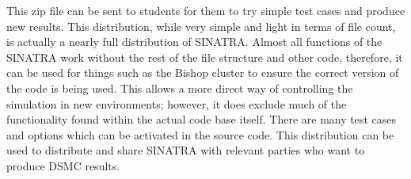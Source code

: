 \indent This zip file can be sent to students for them to try simple test cases and produce new results. This distribution, while very simple and light in terms of file count, is actually a nearly full distribution of SINATRA. Almost all functions of the SINATRA work without the rest of the file structure and other code, therefore, it can be used for things such as the Bishop cluster to ensure the correct version of the code is being used. This allows a more direct way of controlling the simulation in new environments; however, it does exclude much of the functionality found within the actual code base itself. There are many test cases and options which can be activated in the source code. This distribution can be used to distribute and share SINATRA with relevant parties who want to produce DSMC results.
